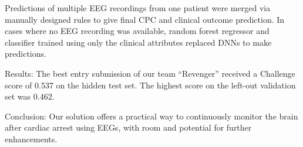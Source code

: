 \documentclass{cinc-abstract}
\begin{document}
Predictions of multiple EEG recordings from one patient were merged via manually designed rules to give final CPC and clinical outcome prediction. In cases where no EEG recording was available, random forest regressor and classifier trained using only the clinical attributes replaced DNNs to make predictions.

Results: The best entry submission of our team ``Revenger'' received a Challenge score of 0.537 on the hidden test set. The highest score on the left-out validation set was 0.462.

Conclusion: Our solution offers a practical way to continuously monitor the brain after cardiac arrest using EEGs, with room and potential for further enhancements.
\end{document}
